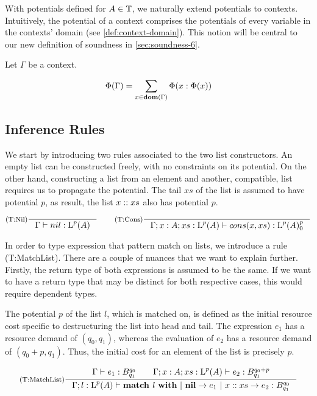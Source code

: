 With potentials defined for \(A \in \mathbb{T}\), we naturally extend potentials to contexts. Intuitively, the potential of a context comprises the potentials of every variable in the contexts' domain (see \cref{def:context-domain}). This notion will be central to our new definition of soundness in \cref{sec:soundness-6}.

\begin{definition}\label{def:context-potential}
   Let \(\Gamma\) be a context.

   \[
      \Phi(\Gamma) = \sum_{x \in \textbf{dom}(\Gamma)} \Phi(x : \Phi(x))
   \]
\end{definition}

\subsection{Inference Rules}

We start by introducing two rules associated to the two list constructors. An empty list can be constructed freely, with no constraints on its potential. On the other hand, constructing a list from an element and another, compatible, list requires us to propagate the potential. The tail \(xs\) of the list is assumed to have potential \(p\), as result, the list \(x :: xs\) also has potential \(p\). 

\[
   \inference[(T:Nil)]
   {}
   {\typing{\Gamma}{nil}{\ralist{p}{A}}}
   \qquad
   \inference[(T:Cons)]
   {}
   {\typing{\Gamma;x : A; xs : \ralist{p}{A}}{cons(x, xs)}{\ratype{\ralist{p}{A}}{p}{0}}}
\]

In order to type expression that pattern match on lists, we introduce a rule (T:MatchList). There are a couple of nuances that we want to explain further. Firstly, the return type of both expressions is assumed to be the same. If we want to have a return type that may be distinct for both respective cases, this would require dependent types. 

The potential \(p\) of the list \(l\), which is matched on, is defined as the initial resource cost specific to destructuring the list into head and tail. The expression \(e_1\) has a resource demand of \((q_0, q_1)\), whereas the evaluation of \(e_2\) has a resource demand of \((q_0 + p, q_1)\). Thus, the initial cost for an element of the list is precisely \(p\).  

\[
   \inference[(T:MatchList)]
   {\typing{\Gamma}{e_1}{\ratype{B}{q_0}{q_1}} \qquad \typing{\Gamma;x : A; xs : \ralist{p}{A}}{e_2}{\ratype{B}{q_0 + p}{q_1}}}
   {\typing{\Gamma;l : \ralist{p}{A}}{\listmatch{l}{e_1}{e_2}}{\ratype{B}{q_0}{q_1}}}
\]

